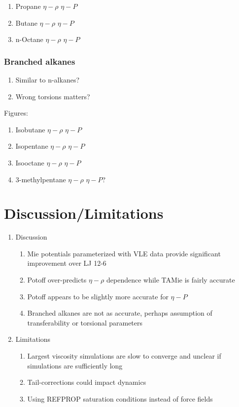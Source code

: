 \documentclass[11pt,a4paper]{article}
\begin{document}
\begin{enumerate}
	\item Propane $\eta-\rho$ $\eta-P$
	\item Butane $\eta-\rho$ $\eta-P$
	\item n-Octane $\eta-\rho$ $\eta-P$
\end{enumerate}

\subsubsection{Branched alkanes}

\begin{enumerate}
	\item Similar to n-alkanes? 
	\item Wrong torsions matters?
\end{enumerate}

Figures:

\begin{enumerate}
	\item Isobutane $\eta-\rho$ $\eta-P$
	\item Isopentane $\eta-\rho$ $\eta-P$
	\item Isooctane $\eta-\rho$ $\eta-P$
	\item 3-methylpentane $\eta-\rho$ $\eta-P$?
\end{enumerate}

\section{Discussion/Limitations}

\begin{enumerate}
	\item Discussion
	\begin{enumerate}
		\item Mie potentials parameterized with VLE data provide significant improvement over LJ 12-6
		\item Potoff over-predicts $\eta-\rho$ dependence while TAMie is fairly accurate
		\item Potoff appears to be slightly more accurate for $\eta-P$
		\item Branched alkanes are not as accurate, perhaps assumption of transferability or torsional parameters
	\end{enumerate}
    \item Limitations
    \begin{enumerate}
    	\item Largest viscosity simulations are slow to converge and unclear if simulations are sufficiently long
    	\item Tail-corrections could impact dynamics
    	\item Using REFPROP saturation conditions instead of force fields
    \end{enumerate}
\end{enumerate}
\end{document}
